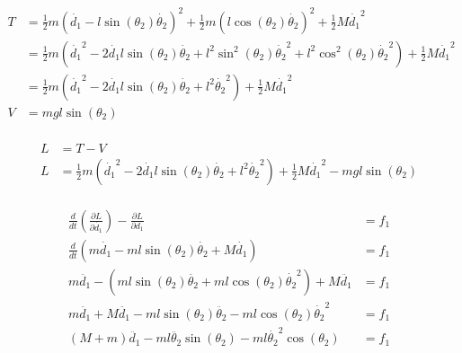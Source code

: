 \begin{solutionbox}[Q1-4]
    \begin{align*}
        T & = \frac{1}{2}m \left(\dot{d_1} - l\sin(\theta_2)\dot{\theta_2}\right)^2 + \frac{1}{2}m\left(l\cos(\theta_2)\dot{\theta_2}\right)^2 + \frac{1}{2}M\dot{d_1}^2                         \\
          & = \frac{1}{2}m \left(\dot{d_1}^2-2\dot{d_1}l\sin(\theta_2)\dot{\theta_2} + l^2\sin^2(\theta_2)\dot{\theta_2}^2 + l^2\cos^2(\theta_2)\dot{\theta_2}^2\right)+ \frac{1}{2}M\dot{d_1}^2 \\
          & = \frac{1}{2}m \left(\dot{d_1}^2-2\dot{d_1}l\sin(\theta_2)\dot{\theta_2} + l^2\dot{\theta_2}^2 \right)+ \frac{1}{2}M\dot{d_1}^2                                                      \\
        V & =mgl\sin(\theta_2)                                                                                                                                                                   \\
    \end{align*}

    \begin{align*}
        L & =T-V                                                                                                                                                \\
        L & =\frac{1}{2}m \left(\dot{d_1}^2-2\dot{d_1}l\sin(\theta_2)\dot{\theta_2} + l^2\dot{\theta_2}^2 \right)+ \frac{1}{2}M\dot{d_1}^2  - mgl\sin(\theta_2) \\
    \end{align*}

    \begin{align*}
        \frac{d}{dt}\left(\frac{\partial L}{\partial \dot{d_1}}\right) - \frac{\partial L}{\partial d_1} & = f_1 \\
        \frac{d}{dt}\left(m\dot{d_1}-ml\sin(\theta_2)\dot{\theta_2}+M\dot{d_1}\right)                    & = f_1 \\
        m\ddot{d_1}-(ml\sin(\theta_2)\ddot{\theta_2}+ml\cos(\theta_2)\dot{\theta_2}^2)+M\ddot{d_1}       & = f_1 \\
        m\ddot{d_1}+M\ddot{d_1}-ml\sin(\theta_2)\ddot{\theta_2}-ml\cos(\theta_2)\dot{\theta_2}^2         & = f_1 \\
        (M+m)\ddot{d_1}-ml\ddot{\theta_2}\sin(\theta_2)-ml\dot{\theta_2}^2\cos(\theta_2)                 & = f_1 \\
    \end{align*}


\end{solutionbox}
